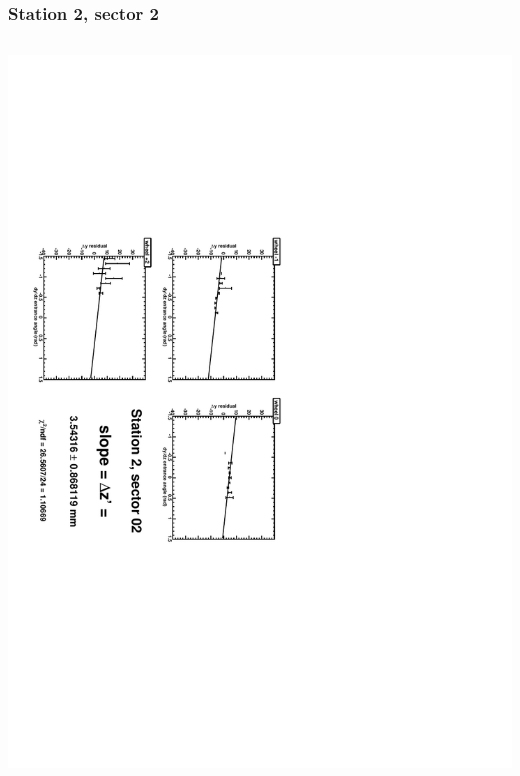 \documentclass[compress]{beamer}
\begin{document}
\begin{frame}
\frametitle{Station 2, sector 2}
\begin{columns}
\includegraphics[height=\linewidth, angle=90]{zfits/zfit_2_02.pdf}


\end{columns}
\end{frame}
\end{document}
